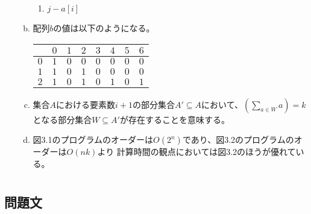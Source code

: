 \documentclass[dvipdfmx,titlepage, 11pt, a4paper]{jsarticle}%
\begin{document}
\begin{enumerate}[(1)]
\begin{enumerate}[(a)]
\begin{enumerate}
      \item[\maru{5}{black}] $j - a[i]$  
    \end{enumerate}
    \item 配列$b$の値は以下のようになる。
    \begin{table}[htbp]
      \centering
      \begin{tabular}{|c|c|c|c|c|c|c|c|}
        \hline
        & $0$ & $1$ & $2$ & $3$ & $4$ & $5$ & $6$\\
        \hline
        $0$ & $1$ & $0$ & $0$ & $0$ & $0$ & $0$ & $0$\\
        \hline
        $1$ & $1$ & $0$ & $1$ & $0$ & $0$ & $0$ & $0$\\
        \hline
        $2$ & $1$ & $0$ & $1$ & $0$ & $1$ & $0$ & $1$\\
        \hline
      \end{tabular}
    \end{table}
    \item 集合$A$における要素数$i + 1$の部分集合$A'\subseteq A$において、$(\sum_{a\in W} a) = k$
    となる部分集合$W\subseteq A'$が存在することを意味する。
    \item 図3.1のプログラムのオーダーは$O(2^n)$であり、図3.2のプログラムのオーダーは$O(nk)$より
    計算時間の観点においては図3.2のほうが優れている。
  \end{enumerate}
\end{enumerate}
\newpage
\section{}
\subsection{問題文}
\newpage
\end{document}
